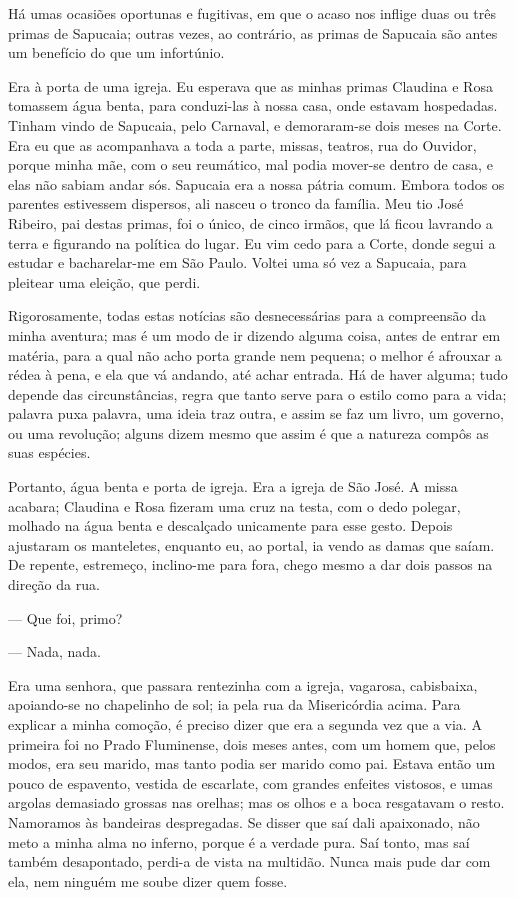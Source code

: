 \noindent{}Há umas ocasiões oportunas e fugitivas, em que o acaso nos inflige duas
ou três primas de Sapucaia; outras vezes, ao contrário, as primas de
Sapucaia são antes um benefício do que um infortúnio.

Era à porta de uma igreja. Eu esperava que as minhas primas Claudina e
Rosa tomassem água benta, para conduzi-las à nossa casa, onde estavam
hospedadas. Tinham vindo de Sapucaia, pelo Carnaval, e demoraram-se dois
meses na Corte. Era eu que as acompanhava a toda a parte, missas,
teatros, rua do Ouvidor, porque minha mãe, com o seu reumático, mal
podia mover-se dentro de casa, e elas não sabiam andar sós. Sapucaia era
a nossa pátria comum. Embora todos os parentes estivessem dispersos, ali
nasceu o tronco da família. Meu tio José Ribeiro, pai destas primas, foi
o único, de cinco irmãos, que lá ficou lavrando a terra e figurando na
política do lugar. Eu vim cedo para a Corte, donde segui a estudar e
bacharelar-me em São Paulo. Voltei uma só vez a Sapucaia, para pleitear
uma eleição, que perdi.

Rigorosamente, todas estas notícias são desnecessárias para a
compreensão da minha aventura; mas é um modo de ir dizendo alguma coisa,
antes de entrar em matéria, para a qual não acho porta grande nem
pequena; o melhor é afrouxar a rédea à pena, e ela que vá andando, até
achar entrada. Há de haver alguma; tudo depende das circunstâncias,
regra que tanto serve para o estilo como para a vida; palavra puxa
palavra, uma ideia traz outra, e assim se faz um livro, um governo, ou
uma revolução; alguns dizem mesmo que assim é que a natureza compôs as
suas espécies.

Portanto, água benta e porta de igreja. Era a igreja de São José. A
missa acabara; Claudina e Rosa fizeram uma cruz na testa, com o dedo
polegar, molhado na água benta e descalçado unicamente para esse gesto.
Depois ajustaram os manteletes, enquanto eu, ao portal, ia vendo as
damas que saíam. De repente, estremeço, inclino-me para fora, chego
mesmo a dar dois passos na direção da rua.

--- Que foi, primo?

--- Nada, nada.

Era uma senhora, que passara rentezinha com a igreja, vagarosa,
cabisbaixa, apoiando-se no chapelinho de sol; ia pela rua da
Misericórdia acima. Para explicar a minha comoção, é preciso dizer que
era a segunda vez que a via. A primeira foi no Prado Fluminense, dois
meses antes, com um homem que, pelos modos, era seu marido, mas tanto
podia ser marido como pai. Estava então um pouco de espavento, vestida
de escarlate, com grandes enfeites vistosos, e umas argolas demasiado
grossas nas orelhas; mas os olhos e a boca resgatavam o resto. Namoramos
às bandeiras despregadas. Se disser que saí dali apaixonado, não meto a
minha alma no inferno, porque é a verdade pura. Saí tonto, mas saí
também desapontado, perdi-a de vista na multidão. Nunca mais pude dar
com ela, nem ninguém me soube dizer quem fosse.

